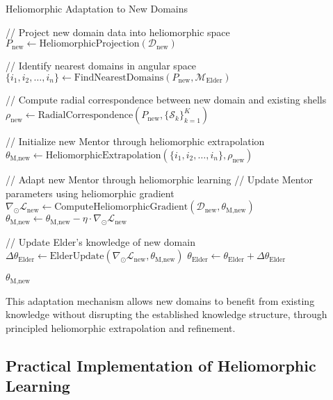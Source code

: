 \begin{algorithm}
\caption{Heliomorphic Adaptation to New Domains}
\begin{algorithmic}[1]
    \State // Project new domain data into heliomorphic space
    \State $P_{\text{new}} \gets \text{HeliomorphicProjection}(\mathcal{D}_{\text{new}})$
    
    \State // Identify nearest domains in angular space
    \State $\{i_1, i_2, \ldots, i_n\} \gets \text{FindNearestDomains}(P_{\text{new}}, \mathcal{M}_{\text{Elder}})$
    
    \State // Compute radial correspondence between new domain and existing shells
    \State $\rho_{\text{new}} \gets \text{RadialCorrespondence}(P_{\text{new}}, \{\mathcal{S}_k\}_{k=1}^K)$
    
    \State // Initialize new Mentor through heliomorphic extrapolation
    \State $\theta_{\text{M,new}} \gets \text{HeliomorphicExtrapolation}(\{i_1, i_2, \ldots, i_n\}, \rho_{\text{new}})$
    
    \State // Adapt new Mentor through heliomorphic learning
        \State // Update Mentor parameters using heliomorphic gradient
        \State $\nabla_{\odot} \mathcal{L}_{\text{new}} \gets \text{ComputeHeliomorphicGradient}(\mathcal{D}_{\text{new}}, \theta_{\text{M,new}})$
        \State $\theta_{\text{M,new}} \gets \theta_{\text{M,new}} - \eta \cdot \nabla_{\odot} \mathcal{L}_{\text{new}}$
        
        \State // Update Elder's knowledge of new domain
        \State $\Delta \theta_{\text{Elder}} \gets \text{ElderUpdate}(\nabla_{\odot} \mathcal{L}_{\text{new}}, \theta_{\text{M,new}})$
        \State $\theta_{\text{Elder}} \gets \theta_{\text{Elder}} + \Delta \theta_{\text{Elder}}$
    \EndFor
    
    \State \Return $\theta_{\text{M,new}}$
\EndFunction
\end{algorithmic}
\end{algorithm}

This adaptation mechanism allows new domains to benefit from existing knowledge without disrupting the established knowledge structure, through principled heliomorphic extrapolation and refinement.

\subsection{Practical Implementation of Heliomorphic Learning}

